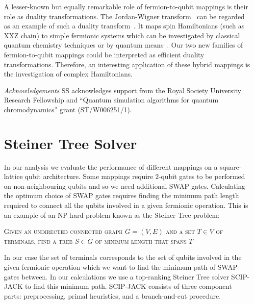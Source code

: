 \documentclass[pdftex,pra,aps,twocolumn,twoside]{revtex4-2}
\theoremstyle{plain}
\theoremstyle{note}
\newcommand\+{{\footnotesize \raisebox{0.3ex}{+}}}
\begin{document}
A lesser-known but equally remarkable role of fermion-to-qubit mappings is their role as duality transformations. The Jordan-Wigner transform~\cite{jordan1993paulische} can be regarded as an example of such a duality transform~\cite{henderson2022strong}. It maps spin Hamiltonians (such as XXZ chain) to simple fermionic systems which can be investigated by classical quantum chemistry techniques or by quantum means~\cite{nishimori2010elements,cao2019quantum}. Our two new families of fermion-to-qubit mappings could be interpreted as efficient duality transformations. Therefore, an interesting application of these hybrid mappings is the investigation of complex Hamiltonians.

{\it Acknowledgements} SS acknowledges support from the Royal Society University Research Fellowship and ``Quantum simulation algorithms for quantum chromodynamics'' grant (ST/W006251/1).



\clearpage
\appendix
\onecolumngrid
\section{Steiner Tree Solver}
\label{section:SCIPJACK}
In our analysis we evaluate the performance of different mappings on a square-lattice qubit architecture. Some mappings require 2-qubit gates to be performed on non-neighbouring qubits and so we need additional SWAP gates. Calculating the optimum choice of SWAP gates requires finding the minimum path length required to connect all the qubits involved in a given fermionic operation. This is an example of an NP-hard problem known as the Steiner Tree problem:

\begin{algorithm}[h]
\centering
\caption*{\label{alg:steinerTree}\textsc{Steiner Tree Problem}}
\begin{algorithmic}
\State \textsc{Given an undirected connected graph $G = (V,E)$ and a set $T \in V$ of terminals, find a tree $S \in G$ of minimum length that spans $T$}
\end{algorithmic}
\end{algorithm}

In our case the set of terminals corresponds to the set of qubits involved in the given fermionic operation which we want to find the minimum path of SWAP gates between. In our calculations we use a top-ranking Steiner Tree solver SCIP-JACK \cite{rehfeldt2021implications} to find this minimum path.  SCIP-JACK consists of three component parts: preprocessing, primal heuristics, and a branch-and-cut procedure.
\end{document}
